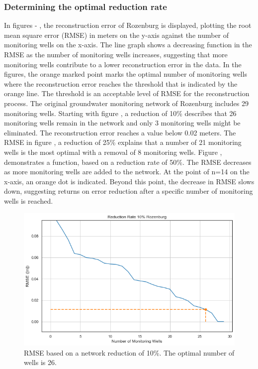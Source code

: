 \newpage

\subsubsection{Determining the optimal reduction rate}
In figures  -  , the reconstruction error of Rozenburg is displayed, plotting the root mean square error (RMSE) in meters on the y-axis against the number of monitoring wells on the x-axis. The line graph shows a decreasing function in the RMSE as the number of monitoring wells increases, suggesting that more monitoring wells contribute to a lower reconstruction error in the data. In the figures, the orange marked point marks the optimal number of monitoring wells where the reconstruction error reaches the threshold that is indicated by the orange line. The threshold is an acceptable level of RMSE for the reconstruction process. The original groundwater monitoring network of Rozenburg includes 29 monitoring wells.
\newline
Starting with figure , a reduction of 10\% describes that 26 monitoring wells remain in the network and only 3 monitoring wells might be eliminated. The reconstruction error reaches a value below 0.02 meters. The RMSE in figure , a reduction of 25\% explains that a number of 21 monitoring wells is the most optimal with a removal of 8 monitoring wells.  Figure , demonstrates a function, based on a reduction rate of 50\%. The RMSE decreases as more monitoring wells are added to the network. At the point of n=14 on the x-axis, an orange dot is indicated. Beyond this point, the decrease in RMSE slows down, suggesting returns on error reduction after a specific number of monitoring wells is reached. 

\begin{figure}[htbp]
    \centering
    \includegraphics[width=0.48\linewidth]{frontmatter/Rozenburg-fig/rozenburg10.png}
    \caption{RMSE based on a network reduction of 10\%. The optimal number of wells is 26.}
    \label{roz10}
\end{figure}

